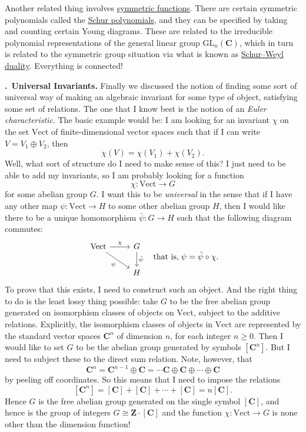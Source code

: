 \documentclass[11pt,noamsfonts]{amsart}
\newcommand{\pointheader}{\vspace{2mm}\noindent\refstepcounter{section}\textbf{\thesection.}}
\newcommand{\bpoint}[1]{\pointheader~{\bf #1.}}
\begin{document}
Another related thing involves \href{https://en.wikipedia.org/wiki/Symmetric_function}{symmetric functions}.
There are certain symmetric polynomials called the
\href{https://en.wikipedia.org/wiki/Schur_polynomial}{Schur polynomials}, and
they can be specified by taking and counting certain Young diagrams. These are
related to the irreducible polynomial representations of the general linear
group \(\mathrm{GL}_n(\mathbf{C})\), which in turn is related to the symmetric
group situation via what is known as \href{https://en.wikipedia.org/wiki/Schur%E2%80%93Weyl_duality}{Schur--Weyl duality}.
Everything is connected!

\bpoint{Universal Invariants}
Finally we discussed the notion of finding some sort of universal way of making
an algebraic invariant for some type of object, satisfying some set of
relations. The one that I know best is the notion of an \emph{Euler characteristic}.
The basic example would be: I am looking for an invariant \(\chi\) on the set
\(\mathrm{Vect}\) of finite-dimensional vector spaces such that
if I can write \(V = V_1 \oplus V_2\), then
\[ \chi(V) = \chi(V_1) + \chi(V_2). \]
Well, what sort of structure do I need to make sense of this? I just need to
be able to add my invariants, so I am probably looking for a function
\[ \chi \colon \mathrm{Vect} \to G \]
for some abelian group \(G\). I want this to be \emph{universal} in the sense
that if I have any other map \(\psi \colon \mathrm{Vect} \to H\) to some
other abelian group \(H\), then I would like there to be a unique homomorphism
\(\bar\psi \colon G \to H\) such that the following diagram commutes:
\[
\begin{tikzcd}
\mathrm{Vect}\rar["\chi"] \ar[dr,"\psi"']  & G \ar[d,"\bar\psi"] \\ & H
\end{tikzcd}
\quad\text{that is,}\; \psi = \bar\psi \circ \chi.
\]
To prove that this exists, I need to construct such an object. And the right
thing to do is the least lossy thing possible: take \(G\) to be the free
abelian group generated on isomorphism classes of objects on \(\mathrm{Vect}\),
subject to the additive relations. Explicitly, the isomorphism classes of objects
in \(\mathrm{Vect}\) are represented by the standard vector spaces \(\mathbf{C}^n\)
of dimension \(n\), for each integer \(n \geq 0\). Then I would like to set \(G\) to be
the abelian group generated by symbols \([\mathbf{C}^n]\). But I need to
subject these to the direct sum relation. Note, however, that
\[
\mathbf{C}^n
= \mathbf{C}^{n-1} \oplus \mathbf{C}
= \cdots \mathbf{C} \oplus \mathbf{C} \oplus \cdots \oplus \mathbf{C}
\]
by peeling off coordinates. So this means that I need to impose the relations
\[ [\mathbf{C}^n] = [\mathbf{C}] + [\mathbf{C}] + \cdots + [\mathbf{C}] = n[\mathbf{C}]. \]
Hence \(G\) is the free abelian group generated on the single symbol \([\mathbf{C}]\), and hence
is the group of integers \(G \cong \mathbf{Z} \cdot [\mathbf{C}]\)
and the function \(\chi \colon \mathrm{Vect} \to G\) is none other than the
dimension function!
\end{document}
